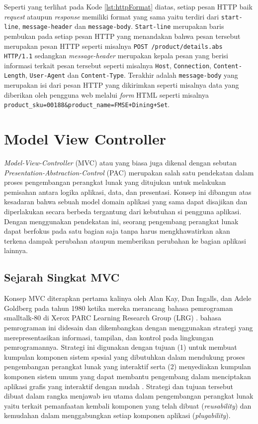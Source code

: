 Seperti yang terlihat pada Kode \ref{lst:httpFormat} diatas, setiap pesan HTTP baik \textit{request} ataupun \textit{response} memiliki format yang sama yaitu terdiri dari \texttt{start-line}, \texttt{message-header} dan \texttt{message-body}. \texttt{Start-line} merupakan baris pembukan pada setiap pesan HTTP yang menandakan bahwa pesan tersebut merupakan pesan HTTP seperti misalnya \texttt{POST /product/details.abs HTTP/1.1} sedangkan \textit{message-header} merupakan kepala pesan yang berisi informasi terkait pesan tersebut seperti misalnya \texttt{Host}, \texttt{Connection}, \texttt{Content-Length}, \texttt{User-Agent} dan \texttt{Content-Type}. Terakhir adalah \texttt{message-body} yang merupakan isi dari pesan HTTP yang dikirimkan seperti misalnya data yang diberikan oleh pengguna web melalui \textit{form} HTML seperti misalnya \texttt{product\_sku=00188\&product\_name=FMSE+Dining+Set}.

\section{Model View Controller}

\textit{Model-View-Controller} (MVC) atau yang biasa juga dikenal dengan sebutan \textit{Presentation-Abstraction-Control} (PAC) merupakan salah satu pendekatan dalam proses pengembangan perangkat lunak yang ditujukan untuk melakukan pemisahan antara logika aplikasi, data, dan presentasi. Konsep ini dibangun atas kesadaran bahwa sebuah model domain aplikasi yang sama dapat disajikan dan diperlakukan secara berbeda tergantung dari kebutuhan si pengguna aplikasi. Dengan menggunakan pendekatan ini, seorang pengembang perangkat lunak dapat berfokus pada satu bagian saja tanpa harus mengkhawatirkan akan terkena dampak perubahan ataupun memberikan perubahan ke bagian aplikasi lainnya.

\subsection{Sejarah Singkat MVC}

Konsep MVC diterapkan pertama kalinya oleh Alan Kay, Dan Ingalls, dan Adele Goldberg pada tahun 1980 ketika mereka merancang bahasa pemrograman smalltalk-80 di Xerox PARC Learning Research Group (LRG) \citep{krasner1988desc}. bahasa pemrograman ini didesain dan dikembangkan dengan menggunakan strategi yang merepresentasikan informasi, tampilan, dan kontrol pada lingkungan pemrogramannya. Strategi ini digunakan dengan tujuan (1) untuk membuat kumpulan komponen sistem spesial yang dibutuhkan dalam mendukung proses pengembangan perangkat lunak yang interaktif serta (2) menyediakan kumpulan komponen sistem umum yang dapat membantu pengembang dalam menciptakan aplikasi grafis yang interaktif dengan mudah \citep{krasner1988desc}. Strategi dan tujuan tersebut dibuat dalam rangka menjawab isu utama dalam pengembangan perangkat lunak yaitu terkait pemanfaatan kembali komponen yang telah dibuat (\textit{reusability}) dan kemudahan dalam menggabungkan setiap komponen aplikasi (\textit{plugability}). \\

